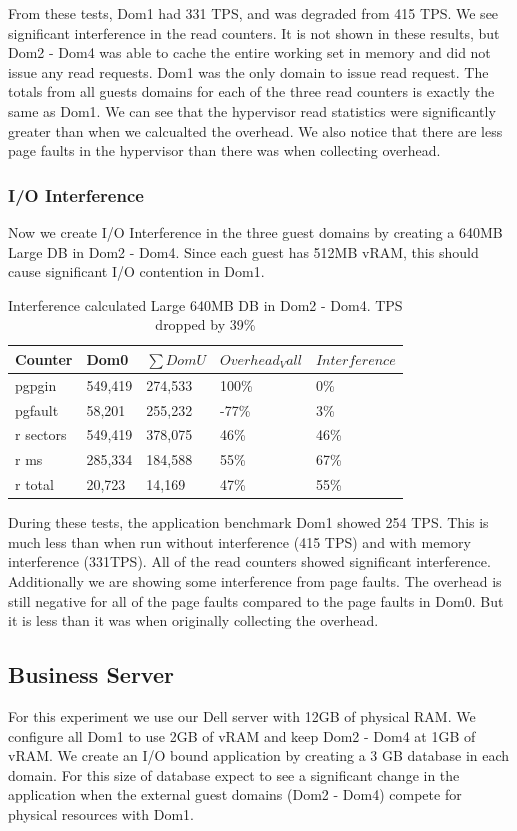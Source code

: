 From these tests, Dom1 had 331 TPS, and was degraded from 415 TPS.  We see significant interference in the read counters.  It is not shown in these results, but Dom2 - Dom4 was able to cache the entire working set in memory and did not issue any read requests.  Dom1 was the only domain to issue read request. The totals from all guests domains for each of the three read counters is exactly the same as Dom1.  We can see that the hypervisor read statistics were significantly greater than when we calcualted the overhead.  We also notice that there are less page faults in the hypervisor than there was when collecting overhead.

\subsubsection{I/O Interference}
Now we create I/O Interference in the three guest domains by creating a 640MB Large DB in Dom2 - Dom4.  Since each guest has 512MB vRAM, this should cause significant I/O contention in Dom1.

\begin{table}[h]
\begin{tabular}{ l l l l p{5cm} }
  Counter & Dom0 & $\sum{DomU}$ & $Overhead_Vall$ & $Interference$ \\
  \hline
	pgpgin    & 549,419 & 274,533 & 100\% &   0\% \\
	pgfault   &  58,201 & 255,232 & -77\% &   3\% \\
	r sectors & 549,419 & 378,075 &  46\% &  46\% \\
	r ms      & 285,334 & 184,588 &  55\% &  67\% \\
	r total   &  20,723 &  14,169 &  47\% &  55\% \\
  \hline
\end{tabular}
\caption{Interference calculated Large 640MB DB in Dom2 - Dom4.  TPS dropped by 39\%}
\label{fig:InterferenceLg}
\end{table}

During these tests, the application benchmark Dom1 showed 254 TPS.  This is much less than when run without interference (415 TPS) and with memory interference (331TPS).  All of the read counters showed significant interference.  Additionally we are showing some interference from page faults.  The overhead is still negative for all of the page faults compared to the page faults in Dom0.  But it is less than it was when originally collecting the overhead.

\subsection{Business Server}
For this experiment we use our Dell server with 12GB of physical RAM. We configure all Dom1 to use 2GB of vRAM and keep Dom2 - Dom4 at 1GB of vRAM. We create an I/O bound application by creating a 3 GB database in each domain. For this size of database expect to see a significant change in the application
when the external guest domains (Dom2 - Dom4) compete for physical resources with Dom1.

